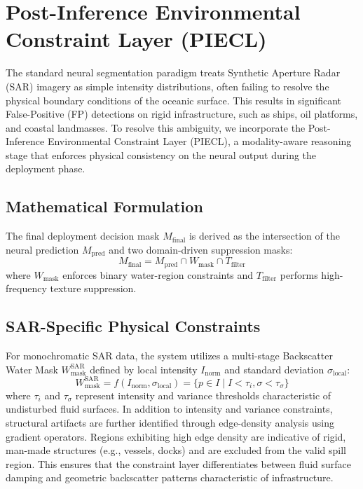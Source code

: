 \section{Post-Inference Environmental Constraint Layer (PIECL)}
The standard neural segmentation paradigm treats Synthetic Aperture Radar (SAR) imagery as simple intensity distributions, often failing to resolve the physical boundary conditions of the oceanic surface. This results in significant False-Positive (FP) detections on rigid infrastructure, such as ships, oil platforms, and coastal landmasses. To resolve this ambiguity, we incorporate the Post-Inference Environmental Constraint Layer (PIECL), a modality-aware reasoning stage that enforces physical consistency on the neural output during the deployment phase.

\subsection{Mathematical Formulation}
The final deployment decision mask $M_{\text{final}}$ is derived as the intersection of the neural prediction $M_{\text{pred}}$ and two domain-driven suppression masks:
\begin{equation}
M_{\text{final}} = M_{\text{pred}} \cap W_{\text{mask}} \cap T_{\text{filter}}
\end{equation}
where $W_{\text{mask}}$ enforces binary water-region constraints and $T_{\text{filter}}$ performs high-frequency texture suppression.

\subsection{SAR-Specific Physical Constraints}
For monochromatic SAR data, the system utilizes a multi-stage Backscatter Water Mask $W_{\text{mask}}^{\text{SAR}}$ defined by local intensity $I_{\text{norm}}$ and standard deviation $\sigma_{\text{local}}$:
\begin{equation}
W_{\text{mask}}^{\text{SAR}} = f(I_{\text{norm}}, \sigma_{\text{local}}) = \{ p \in I \mid I < \tau_i, \sigma < \tau_\sigma \}
\end{equation}
where $\tau_i$ and $\tau_\sigma$ represent intensity and variance thresholds characteristic of undisturbed fluid surfaces. In addition to intensity and variance constraints, structural artifacts are further identified through edge-density analysis using gradient operators. Regions exhibiting high edge density are indicative of rigid, man-made structures (e.g., vessels, docks) and are excluded from the valid spill region. This ensures that the constraint layer differentiates between fluid surface damping and geometric backscatter patterns characteristic of infrastructure.

